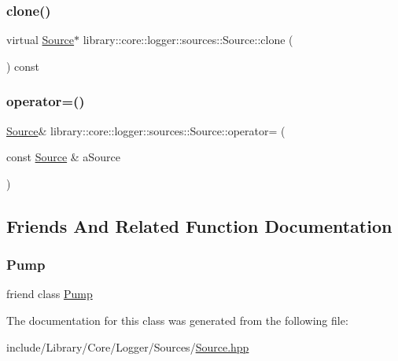 \subsubsection{\texorpdfstring{clone()}{clone()}}
{\footnotesize\ttfamily virtual \hyperlink{classlibrary_1_1core_1_1logger_1_1sources_1_1_source}{Source}$\ast$ library\+::core\+::logger\+::sources\+::\+Source\+::clone (\begin{DoxyParamCaption}{ }\end{DoxyParamCaption}) const\hspace{0.3cm}{\ttfamily [virtual]}}

\mbox{\label{classlibrary_1_1core_1_1logger_1_1sources_1_1_source_a5d08e7063ee3b5d1c2b894d9747cc35f}} 
\subsubsection{\texorpdfstring{operator=()}{operator=()}}
{\footnotesize\ttfamily \hyperlink{classlibrary_1_1core_1_1logger_1_1sources_1_1_source}{Source}\& library\+::core\+::logger\+::sources\+::\+Source\+::operator= (\begin{DoxyParamCaption}\item[{const \hyperlink{classlibrary_1_1core_1_1logger_1_1sources_1_1_source}{Source} \&}]{a\+Source }\end{DoxyParamCaption})\hspace{0.3cm}{\ttfamily [default]}}



\subsection{Friends And Related Function Documentation}
\mbox{\label{classlibrary_1_1core_1_1logger_1_1sources_1_1_source_a64fbdb62a5c5f27e0d022da36aab93d9}} 
\subsubsection{\texorpdfstring{Pump}{Pump}}
{\footnotesize\ttfamily friend class \hyperlink{classlibrary_1_1core_1_1logger_1_1_pump}{Pump}\hspace{0.3cm}{\ttfamily [friend]}}



The documentation for this class was generated from the following file\+:\begin{DoxyCompactItemize}
\item 
include/\+Library/\+Core/\+Logger/\+Sources/\hyperlink{_sources_2_source_8hpp}{Source.\+hpp}\end{DoxyCompactItemize}

